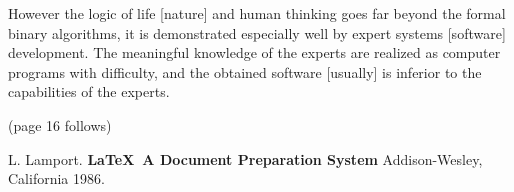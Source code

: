\documentclass[12pt,leqno]{book}
\begin{document}
However the logic of life [nature] and human thinking goes far beyond the formal binary algorithms, it is demonstrated especially well by expert systems [software] development. The meaningful knowledge of the experts are realized as computer programs with difficulty, and the obtained software [usually] is inferior to the capabilities of the experts.

(page 16 follows)

\pagestyle{headings}




\begin{thebibliography}{99}
 L. Lamport. {\bf \LaTeX \ A Document Preparation System}
Addison-Wesley, California 1986.
\end{thebibliography}
\listoffigures
\listoftables

\end{document}

